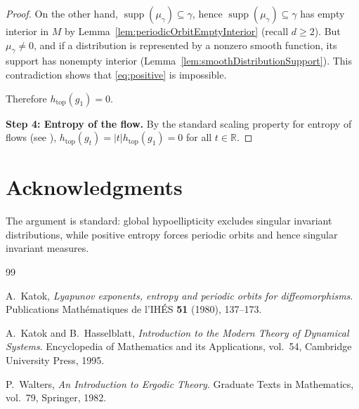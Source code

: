 \documentclass[11pt]{article}
\theoremstyle{definition}
\theoremstyle{remark}
\newcommand{\supp}{\operatorname{supp}}
\newcommand{\htop}{h_{\mathrm{top}}}
\begin{document}
\begin{proof}
On the other hand, $\supp(\mu_\gamma)\subseteq \gamma$, hence $\supp(\mu_\gamma)\subseteq \gamma$ has empty interior in $M$
by Lemma~\ref{lem:periodicOrbitEmptyInterior} (recall $d\ge 2$).
But $\mu_\gamma\neq 0$, and if a distribution is represented by a nonzero smooth function, its support has nonempty interior
(Lemma~\ref{lem:smoothDistributionSupport}).
This contradiction shows that \eqref{eq:positive} is impossible.

Therefore $\htop(g_1)=0$.

\smallskip\noindent\textbf{Step 4: Entropy of the flow.}
By the standard scaling property for entropy of flows (see \cite[Theorem 7.2]{Walters}),
$\htop(g_t)=|t|\htop(g_1)=0$ for all $t\in\mathbb{R}$.
\end{proof}

\section*{Acknowledgments}
The argument is standard: global hypoellipticity excludes singular invariant distributions, while positive entropy forces periodic
orbits and hence singular invariant measures.

\begin{thebibliography}{99}

A.~Katok,
\newblock \emph{Lyapunov exponents, entropy and periodic orbits for diffeomorphisms}.
\newblock Publications Math\'ematiques de l'IH\'ES \textbf{51} (1980), 137--173.

A.~Katok and B.~Hasselblatt,
\newblock \emph{Introduction to the Modern Theory of Dynamical Systems}.
\newblock Encyclopedia of Mathematics and its Applications, vol.~54, Cambridge University Press, 1995.

P.~Walters,
\newblock \emph{An Introduction to Ergodic Theory}.
\newblock Graduate Texts in Mathematics, vol.~79, Springer, 1982.

\end{thebibliography}
\end{document}
